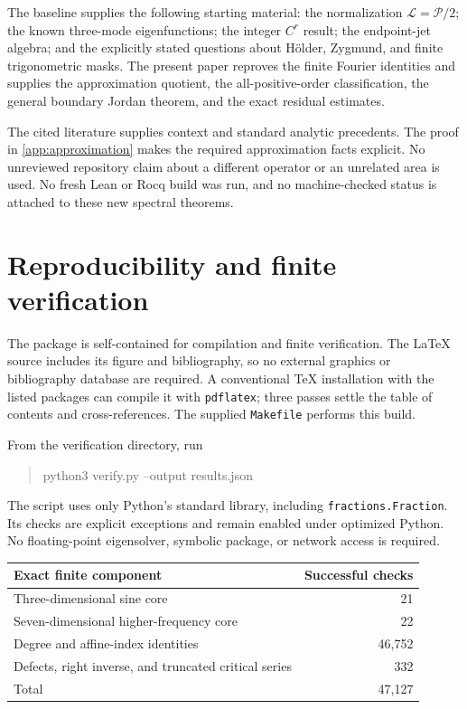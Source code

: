 \documentclass[11pt,a4paper]{article}
\numberwithin{equation}{section}
\theoremstyle{definition}
\theoremstyle{remark}
\newcommand{\Pp}{\mathcal P}
\newcommand{\Ll}{\mathcal L}
\begin{document}
The baseline supplies the following starting material: the normalization
$\Ll=\Pp/2$; the known three-mode eigenfunctions; the integer $C^r$
result; the endpoint-jet algebra; and the explicitly stated questions
about H\"older, Zygmund, and finite trigonometric masks. The present
paper reproves the finite Fourier identities and supplies the
approximation quotient, the all-positive-order classification, the
general boundary Jordan theorem, and the exact residual estimates.

The cited literature supplies context and standard analytic precedents.
The proof in \cref{app:approximation} makes the required approximation
facts explicit. No unreviewed repository claim about a different
operator or an unrelated area is used. No fresh Lean or Rocq build was
run, and no machine-checked status is attached to these new spectral
theorems.

\section{Reproducibility and finite verification}
\label{app:verification}

The package is self-contained for compilation and finite verification.
The LaTeX source includes its figure and bibliography, so no external
graphics or bibliography database are required. A conventional TeX
installation with the listed packages can compile it with
\texttt{pdflatex}; three passes settle the table of contents and
cross-references. The supplied \texttt{Makefile} performs this build.

From the verification directory, run
\begin{quote}\ttfamily
python3 verify.py --output results.json
\end{quote}
The script uses only Python's standard library, including
\texttt{fractions.Fraction}. Its checks are explicit exceptions and
remain enabled under optimized Python. No floating-point eigensolver,
symbolic package, or network access is required.

\begin{center}
\small
\begin{tabular}{@{}lr@{}}
\toprule
Exact finite component & Successful checks\\
\midrule
Three-dimensional sine core & 21\\
Seven-dimensional higher-frequency core & 22\\
Degree and affine-index identities & 46,752\\
Defects, right inverse, and truncated critical series & 332\\
\midrule
Total & 47,127\\
\bottomrule
\end{tabular}
\end{center}
\end{document}
